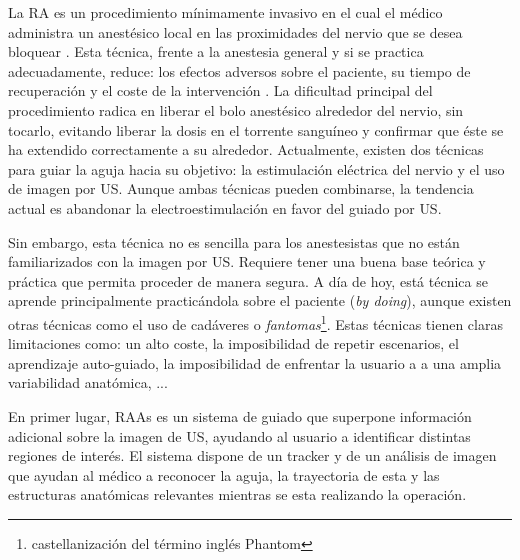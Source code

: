 La \ac{RA} es un procedimiento mínimamente invasivo en el cual el médico administra un anestésico local en las proximidades del nervio que se desea bloquear \cite{CVraisra}. Esta técnica, frente a la anestesia general y si se practica adecuadamente, reduce: los efectos adversos sobre el paciente, su tiempo de recuperación y el coste de la intervención \cite{PMID:26695878}. La dificultad principal del procedimiento radica en liberar el bolo anestésico alrededor del nervio, sin tocarlo, evitando liberar la dosis en el torrente sanguíneo y confirmar que éste se ha extendido correctamente a su alrededor. Actualmente, existen dos técnicas para guiar la aguja hacia su objetivo: la estimulación eléctrica del nervio y el uso de imagen por \ac{US}. Aunque ambas técnicas pueden combinarse, la tendencia actual es abandonar la electroestimulación en favor del guiado por \ac{US}.

Sin embargo, esta técnica no es sencilla para los anestesistas que no están familiarizados con la imagen por \ac{US}. Requiere tener una buena base teórica y práctica que permita proceder de manera segura. A día de hoy, está técnica se aprende principalmente practicándola sobre el paciente (\emph{by doing}), aunque existen otras técnicas como el uso de cadáveres\cite{Tsui2007} o \emph{fantomas}\footnote{castellanización del término inglés Phantom}\cite{phantomra}. Estas técnicas tienen claras limitaciones como: un alto coste, 
la imposibilidad de repetir escenarios, el aprendizaje auto-guiado, 
la imposibilidad de enfrentar la usuario a a una amplia variabilidad anatómica, ...

En primer lugar, \ac{RAAs} es un sistema de guiado que superpone información adicional sobre la imagen de \ac{US}, ayudando al usuario a identificar distintas regiones de interés. El sistema dispone de un \ac{tracker} y de un análisis de imagen que ayudan al médico a reconocer la aguja, la trayectoria de esta y las estructuras anatómicas relevantes mientras se esta realizando la operación. 


